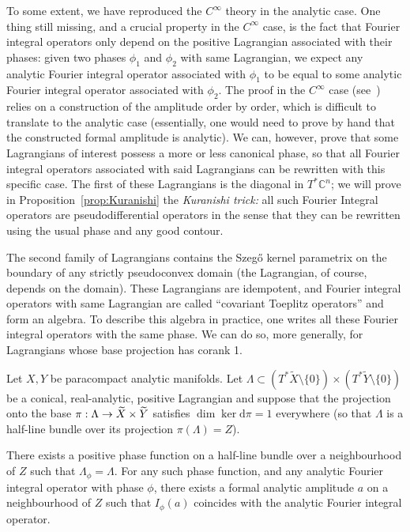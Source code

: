 \documentclass[10pt]{amsart}
\theoremstyle{definition}\newtheorem{defi}[theo]{Definition}\newtheorem{rema}[theo]{Remark}\newtheorem{exam}[theo]{Example}\newtheorem{exem}[theo]{Example}\newtheorem{nota}[theo]{Notation}
\newcommand\1{\mathds{1}}
\newcommand{\C}{\mathbb{C}}
\newcommand{\dd}{\mathrm{d}}
\renewcommand*{\to}{\mathchoice{\longrightarrow}{\rightarrow}{\rightarrow}{\rightarrow}}
\begin{document}
To some extent, we have reproduced the $C^{\infty}$ theory in the analytic case. One thing still missing, and a crucial property in the $C^{\infty}$ case, is the fact that Fourier {integral} operators only depend on the positive Lagrangian associated with their phases: given two phases $\phi_1$ and $\phi_2$ with same Lagrangian, we expect any analytic Fourier integral operator associated with $\phi_1$ to be equal to some analytic Fourier integral operator associated with $\phi_2$. The proof in the $C^{\infty}$ case (see~\cite[Proposition~25.1.5]{hormander_analysis_1985}) relies on a construction of the amplitude order by order, which is difficult to translate to the analytic case (essentially, one would need to prove by hand that the constructed formal amplitude is analytic). We can, however, prove that some Lagrangians of interest possess a more or less canonical phase, so that all Fourier integral operators associated with said Lagrangians can be rewritten with this specific case. The first of these Lagrangians is the diagonal in $T^*\C^n$; we will prove in Proposition~\ref{prop:Kuranishi} the \emph{Kuranishi trick:} all such Fourier {Integral} operators are pseudodifferential operators in the sense that they can be rewritten using the usual phase and any good contour.

The second family of Lagrangians contains the Szeg\H{o} kernel parametrix on the boundary of any strictly pseudoconvex domain (the Lagrangian, of course, depends on the domain). These Lagrangians are idempotent, and Fourier {integral operators} with same Lagrangian are called ``covariant Toeplitz operators'' and form an algebra. To describe this algebra in practice, one writes all these Fourier integral operators with the same phase. We can do so, more generally, for Lagrangians whose base projection has corank 1.

\pagebreak{}
\begin{prop}\label{prop:FIO-rank1-phase}
Let $X,Y$ be paracompact analytic manifolds. Let $\Lambda\subset (T^*\widetilde{X}\setminus \{0\})\times (T^*\widetilde{Y}\setminus
\{0\})$ be a conical, real-analytic, positive Lagrangian and suppose that the projection onto the base $\pi:\Lambda\to \widetilde{X}\times \widetilde{Y}$ satisfies $\dim
\ker \dd\pi=1$ everywhere (so that $\Lambda$ is a half-line bundle over its projection $\pi(\Lambda)=Z$).

There exists a positive phase function on a half-line bundle over a neighbourhood of $Z$ such that $\Lambda_{\phi}=\Lambda$. For any such phase function, and any analytic Fourier integral operator with phase $\phi$, there exists a formal analytic amplitude $a$ on a neighbourhood of $Z$ such that $I_{\phi}(a)$ coincides with the analytic Fourier integral operator.
\end{prop}
\end{document}

